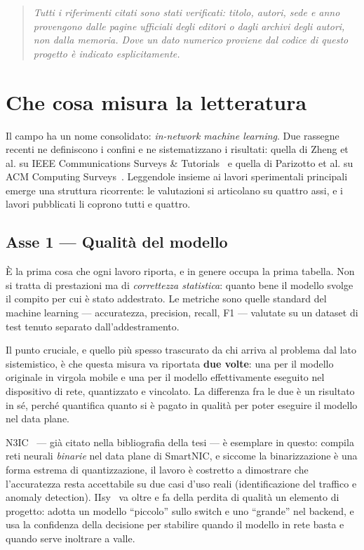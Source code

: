 \documentclass[11pt,a4paper,oneside]{report}
\newenvironment{nota}
  {\begin{quote}\small\color{soft}\itshape}
  {\end{quote}}
\begin{document}
\begin{nota}
Tutti i riferimenti citati sono stati verificati: titolo, autori, sede
e anno provengono dalle pagine ufficiali degli editori o dagli archivi
degli autori, non dalla memoria. Dove un dato numerico proviene dal
codice di questo progetto è indicato esplicitamente.
\end{nota}

\chapter{Che cosa misura la letteratura}
\label{ch:cosa}

Il campo ha un nome consolidato: \emph{in-network machine learning}.
Due rassegne recenti ne definiscono i confini e ne sistematizzano i
risultati: quella di Zheng et al. su IEEE Communications Surveys \&
Tutorials~\cite{zheng24survey} e quella di Parizotto et al. su ACM
Computing Surveys~\cite{parizotto23survey}. Leggendole insieme ai
lavori sperimentali principali emerge una struttura ricorrente: le
valutazioni si articolano su quattro assi, e i lavori pubblicati li
coprono tutti e quattro.

\section{Asse 1 --- Qualità del modello}

È la prima cosa che ogni lavoro riporta, e in genere occupa la prima
tabella. Non si tratta di prestazioni ma di \emph{correttezza
statistica}: quanto bene il modello svolge il compito per cui è stato
addestrato. Le metriche sono quelle standard del machine learning ---
accuratezza, precision, recall, F1 --- valutate su un dataset di test
tenuto separato dall'addestramento.

Il punto cruciale, e quello più spesso trascurato da chi arriva al
problema dal lato sistemistico, è che questa misura va riportata
\textbf{due volte}: una per il modello originale in virgola mobile e
una per il modello effettivamente eseguito nel dispositivo di rete,
quantizzato e vincolato. La differenza fra le due è un risultato in
sé, perché quantifica quanto si è pagato in qualità per poter eseguire
il modello nel data plane.

N3IC~\cite{siracusano22n3ic} --- già citato nella bibliografia della
tesi --- è esemplare in questo: compila reti neurali \emph{binarie}
nel data plane di SmartNIC, e siccome la binarizzazione è una forma
estrema di quantizzazione, il lavoro è costretto a dimostrare che
l'accuratezza resta accettabile su due casi d'uso reali
(identificazione del traffico e anomaly detection). IIsy~\cite{zheng24iisy}
va oltre e fa della perdita di qualità un elemento di progetto: adotta
un modello ``piccolo'' sullo switch e uno ``grande'' nel backend, e usa
la confidenza della decisione per stabilire quando il modello in rete
basta e quando serve inoltrare a valle.
\end{document}
